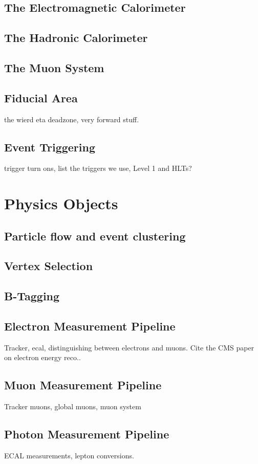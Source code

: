 \subsection{The Electromagnetic Calorimeter}
\subsection{The Hadronic Calorimeter}
\subsection{The Muon System}
\subsection{Fiducial Area}
the wierd eta deadzone, very forward stuff.
\subsection{Event Triggering} \label{sec:event_triggering}
trigger turn ons, list the triggers we use, Level 1 and HLTs?


\section{Physics Objects}
\subsection{Particle flow and event clustering} \label{sec:particle_flow}
\subsection{Vertex Selection}
\subsection{B-Tagging}
\subsection{Electron Measurement Pipeline} \label{sec:electron_measurement_pipeline}
Tracker, ecal, distinguishing between electrons and muons. Cite the CMS paper on electron energy reco..
\subsection{Muon Measurement Pipeline} \label{sec:muon_measurement_pipeline}
Tracker muons, global muons, muon system
\subsection{Photon Measurement Pipeline}
ECAL measurements, lepton conversions.
